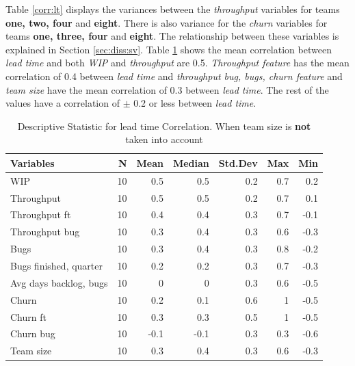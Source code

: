 \documentclass[UKenglish]{ifimaster}  %
\begin{document}
Table \ref{corr:lt} displays the variances between the \textit{throughput} variables for teams \textbf{one, two, four} and \textbf{eight}. There is also variance for the \textit{churn} variables for teams \textbf{one, three, four} and \textbf{eight}. The relationship between these variables is explained in Section \ref{sec:diss:sv}. Table \ref{DS:corr:LT} shows the mean correlation between \textit{lead time} and both \textit{WIP} and \textit{throughput} are 0.5. \textit{Throughput feature} has the mean correlation of 0.4 between \textit{lead time} and \textit{throughput bug, bugs, churn feature} and \textit{team size} have the mean correlation of 0.3 between \textit{lead time}. The rest of the values have a correlation of $\pm$ 0.2 or less between \textit{lead time}.



\begin{table}[H]
 \caption{Descriptive Statistic for lead time Correlation. When team size is \textbf{not} taken into account}
 \centering
 \begin{tabular}{ | l | r | r | r | r | r | r | }
 \hline
\textbf{Variables}& \bf{N} & \bf{Mean} & \bf{Median} & \bf{Std.Dev} & \bf{Max} & \bf{Min} \\ \hline
WIP  & 10 & 0.5 & 0.5 & 0.2 & 0.7 & 0.2\\ \hline
Throughput  & 10 & 0.5 & 0.5 & 0.2 & 0.7 & 0.1\\ \hline
Throughput ft  & 10 & 0.4 & 0.4 & 0.3 & 0.7 & -0.1\\ \hline
Throughput bug  & 10 & 0.3 & 0.4 & 0.3 & 0.6 & -0.3\\ \hline
Bugs  & 10 & 0.3 & 0.4 & 0.3 & 0.8 & -0.2\\ \hline
Bugs finished, quarter  & 10 & 0.2 & 0.2 & 0.3 & 0.7 & -0.3\\ \hline
Avg days backlog, bugs  & 10 & 0 & 0 & 0.3 & 0.6 & -0.5\\ \hline
Churn  & 10 & 0.2 & 0.1 & 0.6 & 1 & -0.5\\ \hline
Churn ft  & 10 & 0.3 & 0.3 & 0.5 & 1 & -0.5\\ \hline
Churn bug  & 10 & -0.1 & -0.1 & 0.3 & 0.3 & -0.6\\ \hline
Team size  & 10 & 0.3 & 0.4 & 0.3 & 0.6 & -0.3\\ \hline
\end{tabular}
 \label{DS:corr:LT}
 \end{table}
\end{document}
